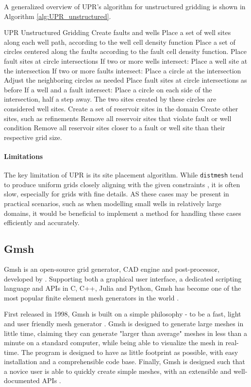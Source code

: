 A generalized overview of UPR's algorithm for unstructured gridding \cite[pp.51]{UPR_thesis} is shown in Algorithm \ref{alg:UPR_unstructured}.
\begin{pseudocode}[float=ht,label=alg:UPR_unstructured]{UPR Unstructured Gridding}
Create faults and wells
    Place a set of well sites along each well path, according to the well cell density function
    Place a set of circles centered along the faults according to the fault cell density function. Place fault sites at circle intersections
    If two or more wells intersect:
        Place a well site at the intersection
    If two or more faults intersect:
        Place a circle at the intersection
        Adjust the neighboring circles as needed
        Place fault sites at circle intersections as before
    If a well and a fault intersect:
        Place a circle on each side of the intersection, half a step away. The two sites created by these circles are considered well sites.
Create a set of reservoir sites in the domain
Create other sites, such as refinements
Remove all reservoir sites that violate fault or well condition
Remove all reservoir sites closer to a fault or well site than their respective grid size.
\end{pseudocode}

\paragraph{Limitations}
The key limitation of UPR is its site placement algorithm. While \verb|distmesh| tend to produce uniform grids closely aligning with the given constraints \cite{UPR_thesis}, it is often slow, especially for grids with fine details. AS these cases may be present in practical scenarios, such as when modelling small wells in relatively large domains, it would be beneficial to implement a method for handling these cases efficiently and accurately.


\subsection{Gmsh}
\label{sec:Gmsh}
Gmsh is an open-source grid generator, CAD engine and post-processor, developed by \textcite{Gmsh_article}. Supporting both a graphical user interface, a dedicated scripting language and APIs in C, C++, Julia and Python, Gmsh has become one of the most popular finite element mesh generators in the world \cite{Gmsh_presentation}.

First released in 1998, Gmsh is built on a simple philosophy - to be a fast, light and user friendly mesh generator \cite{Gmsh_article}. Gmsh is designed to generate large meshes in little time, claiming they can generate "larger than average" meshes in less than a minute on a standard computer, while being able to visualize the mesh in real-time. The program is designed to have as little footprint as possible, with easy installation and a comprehensible code base. Finally, Gmsh is designed such that a novice user is able to quickly create simple meshes, with an extensible and well-documented APIs \cite{Gmsh_presentation}.

